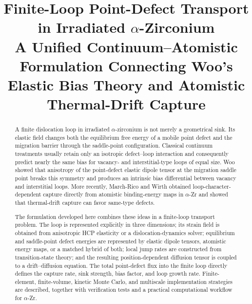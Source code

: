 \documentclass[11pt]{article}
\title{\textbf{Finite-Loop Point-Defect Transport in Irradiated $\alpha$-Zirconium}\\
A Unified Continuum--Atomistic Formulation Connecting Woo's Elastic Bias Theory and Atomistic Thermal-Drift Capture}
\author{}
\date{}
\begin{document}
\maketitle

\begin{abstract}
A finite dislocation loop in irradiated $\alpha$-zirconium is not merely a geometrical sink. Its elastic field changes both the equilibrium free energy of a mobile point defect and the migration barrier through the saddle-point configuration. Classical continuum treatments usually retain only an isotropic defect--loop interaction and consequently predict nearly the same bias for vacancy- and interstitial-type loops of equal size. Woo showed that anisotropy of the point-defect elastic dipole tensor at the migration saddle point breaks this symmetry and produces an intrinsic bias differential between vacancy and interstitial loops. More recently, March-Rico and Wirth obtained loop-character-dependent capture directly from atomistic binding-energy maps in $\alpha$-Zr and showed that thermal-drift capture can favor same-type defects.

The formulation developed here combines these ideas in a finite-loop transport problem. The loop is represented explicitly in three dimensions; its strain field is obtained from anisotropic HCP elasticity or a dislocation-dynamics solver; equilibrium and saddle-point defect energies are represented by elastic dipole tensors, atomistic energy maps, or a matched hybrid of both; local jump rates are constructed from transition-state theory; and the resulting position-dependent diffusion tensor is coupled to a drift--diffusion equation. The total point-defect flux into the finite loop directly defines the capture rate, sink strength, bias factor, and loop growth rate. Finite-element, finite-volume, kinetic Monte Carlo, and multiscale implementation strategies are described, together with verification tests and a practical computational workflow for $\alpha$-Zr.
\end{abstract}

\tableofcontents
\newpage
\end{document}
